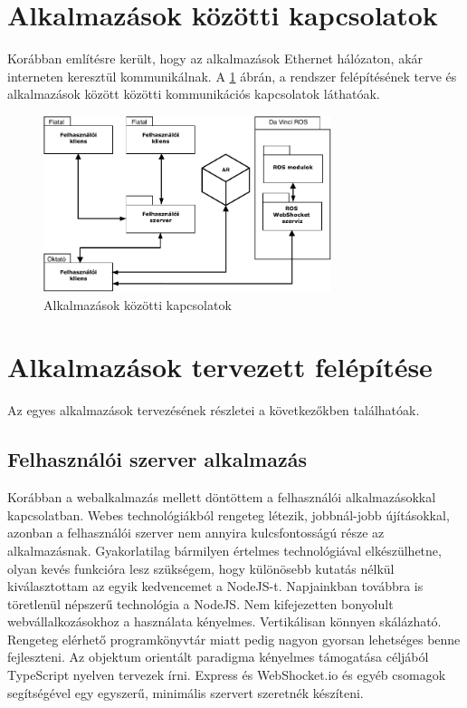\documentclass[12pt,a4paper,oneside]{report} %
\begin{document}
\section{Alkalmazások közötti kapcsolatok}
Korábban említésre került, hogy az alkalmazások Ethernet hálózaton, akár interneten keresztül kommunikálnak. A \ref{fig:kapcs} ábrán, a rendszer felépítésének terve és alkalmazások között közötti kommunikációs kapcsolatok láthatóak.
\begin{figure}[h]
	\centering
	\includegraphics[width=0.75\textwidth]{dias/alkalmazas_kapcsolatok}
	\caption{Alkalmazások közötti kapcsolatok}%
	\label{fig:kapcs}
\end{figure}

\section{Alkalmazások tervezett felépítése}
Az egyes alkalmazások tervezésének részletei a következőkben találhatóak.
\subsection{Felhasználói szerver alkalmazás}
Korábban a webalkalmazás mellett döntöttem a felhasználói alkalmazásokkal kapcsolatban. Webes technológiákból rengeteg létezik, jobbnál-jobb újításokkal, azonban a felhasználói szerver nem annyira kulcsfontosságú része az alkalmazásnak. Gyakorlatilag bármilyen értelmes technológiával elkészülhetne, olyan kevés funkcióra lesz szükségem, hogy különösebb kutatás nélkül kiválasztottam az egyik kedvencemet a NodeJS-t.
Napjainkban továbbra is töretlenül népszerű technológia a NodeJS. Nem kifejezetten bonyolult webvállalkozásokhoz a használata kényelmes. Vertikálisan könnyen skálázható. Rengeteg elérhető programkönyvtár miatt pedig nagyon gyorsan lehetséges benne fejleszteni.
Az objektum orientált paradigma kényelmes támogatása céljából TypeScript nyelven tervezek írni. Express és WebShocket.io és egyéb csomagok segítségével egy egyszerű, minimális szervert szeretnék készíteni.
\end{document}
